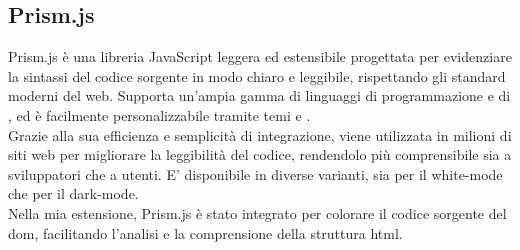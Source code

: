 \subsection{Prism.js}
\label{subsec:prism}
\noindent Prism.js è una libreria JavaScript leggera ed estensibile progettata per evidenziare la sintassi del codice sorgente in modo chiaro e leggibile, rispettando gli standard moderni del web.
Supporta un’ampia gamma di linguaggi di programmazione e di , ed è facilmente personalizzabile tramite temi e . \\
Grazie alla sua efficienza e semplicità di integrazione, viene utilizzata in milioni di siti web per migliorare la leggibilità del codice, rendendolo più comprensibile sia a sviluppatori che a utenti. E’ disponibile in diverse varianti, sia per il white-mode che per il dark-mode.\\
Nella mia estensione, Prism.js è stato integrato per colorare il codice sorgente del \acrshort{dom}, facilitando l’analisi e la comprensione della struttura \acrshort{html}.

